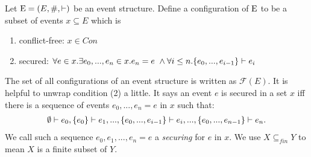 \begin{definition}[Configuration]
    \label{conf}
    Let $\mathrm{E} = (E,\#,\vdash)$ be an event structure.
    Define a configuration of $\mathrm{E}$ to be a subset of events $x \subseteq E$ which is
    \begin{enumerate}
        \item conflict-free: $x \in Con$
        \item secured: $\forall e \in x. \exists e_0,...,e_n \in x. e_n = e \ \wedge
                  \forall i \leq n. \{e_0,...,e_{i-1}\} \vdash e_i$
    \end{enumerate}
\end{definition}
The set of all configurations of an event structure is written as $\mathcal{F}(E)$.
It is helpful to unwrap condition (2) a little. It says an event $e$ is secured in a set $x$
iff there is a sequence of events $e_0,...,e_n = e$ in $x$ such that:
\begin{align*}
    \emptyset \vdash e_0, \{e_0\} \vdash e_1, ..., \{e_0,...,e_{i-1}\} \vdash e_i,...,
    \{e_0,...,e_{n-1}\} \vdash e_n.
\end{align*}
We call such a sequence $e_0,e_1,...,e_n = e$ a \emph{securing} for $e$ in $x$.
We use $X \subseteq_{fin} Y$ to mean $X$ is a finite subset of $Y$.

